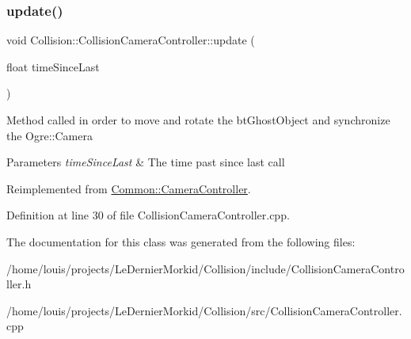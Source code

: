 \subsubsection{\texorpdfstring{update()}{update()}}
{\footnotesize\ttfamily void Collision\+::\+Collision\+Camera\+Controller\+::update (\begin{DoxyParamCaption}\item[{float}]{time\+Since\+Last }\end{DoxyParamCaption})\hspace{0.3cm}{\ttfamily [virtual]}}

Method called in order to move and rotate the bt\+Ghost\+Object and synchronize the Ogre\+::\+Camera 
\begin{DoxyParams}{Parameters}
{\em time\+Since\+Last} & The time past since last call \\
\hline
\end{DoxyParams}


Reimplemented from \hyperlink{class_common_1_1_camera_controller_a5d11cbced7f78eec997b96bb489d0806}{Common\+::\+Camera\+Controller}.



Definition at line 30 of file Collision\+Camera\+Controller.\+cpp.



The documentation for this class was generated from the following files\+:\begin{DoxyCompactItemize}
\item 
/home/louis/projects/\+Le\+Dernier\+Morkid/\+Collision/include/Collision\+Camera\+Controller.\+h\item 
/home/louis/projects/\+Le\+Dernier\+Morkid/\+Collision/src/Collision\+Camera\+Controller.\+cpp\end{DoxyCompactItemize}
